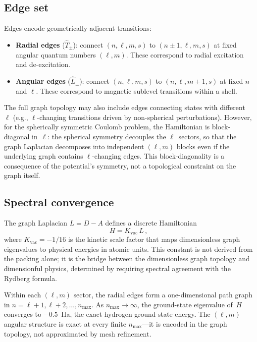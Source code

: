 \documentclass[aps,prl,reprint,amsmath,amssymb]{revtex4-2}
\begin{document}
\subsection{Edge set}

Edges encode geometrically adjacent transitions:
\begin{itemize}
\item \textbf{Radial edges} ($\hat{T}_{\pm}$): connect
  $(n, \ell, m, s)$ to $(n \pm 1, \ell, m, s)$ at fixed angular
  quantum numbers $(\ell, m)$.  These correspond to radial excitation
  and de-excitation.

\item \textbf{Angular edges} ($\hat{L}_{\pm}$): connect
  $(n, \ell, m, s)$ to $(n, \ell, m \pm 1, s)$ at fixed $n$ and
  $\ell$.  These correspond to magnetic sublevel transitions within a
  shell.
\end{itemize}

The full graph topology may also include edges connecting states with
different~$\ell$ (e.g., $\ell$-changing transitions driven by
non-spherical perturbations).  However, for the spherically symmetric
Coulomb problem, the Hamiltonian is block-diagonal in~$\ell$: the
spherical symmetry decouples the $\ell$~sectors, so that the graph
Laplacian decomposes into independent $(\ell, m)$ blocks even if the
underlying graph contains $\ell$-changing edges.  This
block-diagonality is a consequence of the potential's symmetry, not a
topological constraint on the graph itself.

\subsection{Spectral convergence}

The graph Laplacian $L = D - A$ defines a discrete Hamiltonian
\begin{equation}
  H = K_{\mathrm{vac}} \, L \,,
  \label{eq:graph-hamiltonian}
\end{equation}
where $K_{\mathrm{vac}} = -1/16$ is the kinetic scale factor that
maps dimensionless graph eigenvalues to physical energies in atomic
units.  This constant is not derived from the packing alone; it is the
bridge between the dimensionless graph topology and dimensionful
physics, determined by requiring spectral agreement with the Rydberg
formula.

Within each $(\ell, m)$ sector, the radial edges form a
one-dimensional path graph in $n = \ell+1, \ell+2, \ldots, n_{\max}$.
As $n_{\max} \to \infty$, the ground-state eigenvalue of~$H$
converges to $-0.5$~Ha, the exact hydrogen ground-state energy.  The
$(\ell, m)$ angular structure is exact at every finite $n_{\max}$---it
is encoded in the graph topology, not approximated by mesh refinement.
\end{document}

